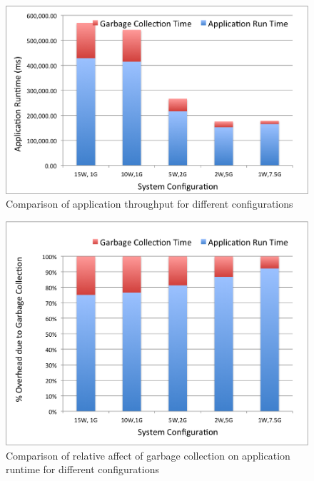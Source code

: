 \begin{figure}[!ht]
\caption{Comparison of application throughput for different configurations}
\label{fig:exp4}
\includegraphics[scale=0.50]{./images/exp4.png}
\end{figure}


\begin{figure}[!ht]
\caption{Comparison of relative affect of garbage collection on application runtime for different configurations}
\label{fig:exp4_2}
\includegraphics[scale=0.50]{./images/exp4_2.png}
\end{figure}

